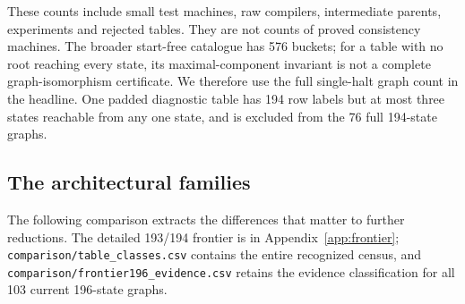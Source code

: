 \documentclass[11pt,letterpaper]{article}
\newcommand{\file}[1]{\texttt{\nolinkurl{#1}}}
\begin{document}
These counts include small test machines, raw compilers, intermediate
parents, experiments and rejected tables. They are not counts of proved
consistency machines. The broader start-free catalogue has 576 buckets;
for a table with no root reaching every state, its maximal-component
invariant is not a complete graph-isomorphism certificate. We therefore
use the full single-halt graph count in the headline. One padded diagnostic
table has 194 row labels but at most three states reachable from any one
state, and is excluded from the 76 full 194-state graphs.

\subsection{The architectural families}

The following comparison extracts the differences that matter to further
reductions. The detailed 193/194 frontier is in Appendix~\ref{app:frontier};
\file{comparison/table_classes.csv} contains the entire recognized census,
and \file{comparison/frontier196_evidence.csv} retains the evidence
classification for all 103 current 196-state graphs.
\end{document}
